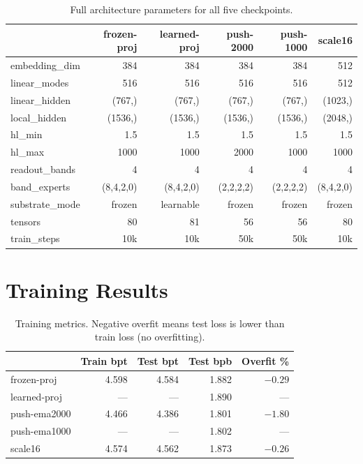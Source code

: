 \documentclass[11pt,a4paper]{report}
\begin{document}
\begin{table}[h]
\centering
\begin{tabular}{lrrrrr}
\toprule
& \textbf{frozen-proj} & \textbf{learned-proj} & \textbf{push-2000} & \textbf{push-1000} & \textbf{scale16} \\
\midrule
embedding\_dim & 384 & 384 & 384 & 384 & 512 \\
linear\_modes & 516 & 516 & 516 & 516 & 512 \\
linear\_hidden & (767,) & (767,) & (767,) & (767,) & (1023,) \\
local\_hidden & (1536,) & (1536,) & (1536,) & (1536,) & (2048,) \\
hl\_min & 1.5 & 1.5 & 1.5 & 1.5 & 1.5 \\
hl\_max & 1000 & 1000 & 2000 & 1000 & 1000 \\
readout\_bands & 4 & 4 & 4 & 4 & 4 \\
band\_experts & (8,4,2,0) & (8,4,2,0) & (2,2,2,2) & (2,2,2,2) & (8,4,2,0) \\
substrate\_mode & frozen & learnable & frozen & frozen & frozen \\
tensors & 80 & 81 & 56 & 56 & 80 \\
train\_steps & 10k & 10k & 50k & 50k & 10k \\
\bottomrule
\end{tabular}
\caption{Full architecture parameters for all five checkpoints.}
\label{tab:full_arch}
\end{table}

\section{Training Results}

\begin{table}[h]
\centering
\begin{tabular}{lrrrr}
\toprule
& \textbf{Train bpt} & \textbf{Test bpt} & \textbf{Test bpb} & \textbf{Overfit \%} \\
\midrule
frozen-proj & 4.598 & 4.584 & 1.882 & $-0.29$ \\
learned-proj & --- & --- & 1.890 & --- \\
push-ema2000 & 4.466 & 4.386 & 1.801 & $-1.80$ \\
push-ema1000 & --- & --- & 1.802 & --- \\
scale16 & 4.574 & 4.562 & 1.873 & $-0.26$ \\
\bottomrule
\end{tabular}
\caption{Training metrics. Negative overfit means test loss is lower than train loss (no overfitting).}
\label{tab:training}
\end{table}
\end{document}

